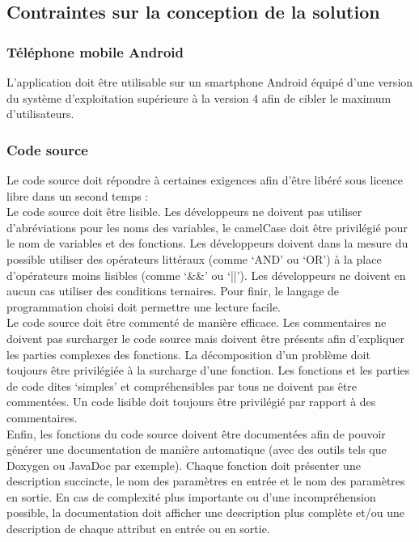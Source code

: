 \subsection{Contraintes sur la conception de la solution} %
\label{sub:contraintes_sur_la_conception_de_la_solution}

	\subsubsection{Téléphone mobile Android}
	L'application doit être utilisable sur un smartphone Android équipé d'une version du système d'exploitation supérieure à la version 4 afin de cibler le maximum d'utilisateurs.

	\subsubsection{Code source}
	Le code source doit répondre à certaines exigences afin d'être libéré sous licence libre dans un second temps :\\

	Le code source doit être lisible. Les développeurs ne doivent pas utiliser d’abréviations pour les noms des variables, le camelCase doit être privilégié pour le nom de variables et des fonctions. Les développeurs doivent dans la mesure du possible utiliser des opérateurs littéraux (comme `AND' ou `OR') à la place d'opérateurs moins lisibles (comme `\&\&' ou `||'). Les développeurs ne doivent en aucun cas utiliser des conditions ternaires. Pour finir, le langage de programmation choisi doit permettre une lecture facile.\\

	Le code source doit être commenté de manière efficace. Les commentaires ne doivent pas surcharger le code source mais doivent être présents afin d'expliquer les parties complexes des fonctions. La décomposition d'un problème doit toujours être privilégiée à la surcharge d'une fonction. Les fonctions et les parties de code dites `simples' et compréhensibles par tous ne doivent pas être commentées. Un code lisible doit toujours être privilégié par rapport à des commentaires.\\

	Enfin, les fonctions du code source doivent être documentées afin de pouvoir générer une documentation de manière automatique (avec des outils tels que Doxygen ou JavaDoc par exemple). Chaque fonction doit présenter une description succincte, le nom des paramètres en entrée et le nom des paramètres en sortie. En cas de complexité plus importante ou d'une incompréhension possible, la documentation doit afficher une description plus complète et/ou une description de chaque attribut en entrée ou en sortie.


